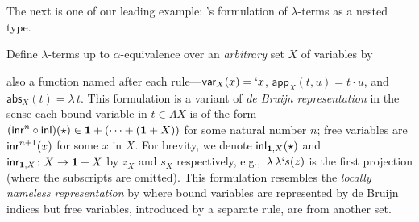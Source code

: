 \documentclass[acmsmall,review]{acmart}\settopmatter{printfolios=true,printccs=false,printacmref=false}
\theoremstyle{acmdefinition}
\begin{document}
The next is one of our leading example: \citet{Bird1999}'s formulation of $\lambda$-terms as a nested type.
\begin{example}\label{ex:untyped-lambda-calculus}
  Define $\lambda$-terms up to $\alpha$-equivalence over an \emph{arbitrary} set $X$ of variables by
\begin{figure}[H]
  \begin{minipage}[b]{.3\textwidth}
    \begin{prooftree}
    \end{prooftree}
  \end{minipage}
  \begin{minipage}[b]{.3\textwidth}
    \begin{prooftree}
    \end{prooftree}
  \end{minipage}
  \begin{minipage}[b]{.3\textwidth}
    \begin{prooftree}
    \end{prooftree}
  \end{minipage}
\end{figure}%
\noindent also a function named after each rule---$\mathsf{var}_X(x) = `x$, $\mathsf{app}_X(t, u) = t \cdot u$, and $\mathsf{abs}_{X}(t) = \lambda\,t$.
  This formulation is a variant of \emph{de Bruijn representation} in the sense each bound variable in $t \in \Lambda X$ is of the form $(\inr^n \circ \inl)(\ttt) \in \Unit + (\cdots + (\Unit + X))$ for some natural number $n$;
  free variables are $\inr^{n+1}(x)$ for some $x$ in $X$.
  For brevity, we denote $\inl_{\Unit, X}(\ttt)$ and $\inr_{\Unit, X} \colon X \to \Unit + X$ by $z_X$ and $s_X$ respectively, e.g.,\ $\lambda\,\lambda `s(z)$ is the first projection (where the subscripts are omitted).
  This formulation resembles the \emph{locally nameless representation} by \citet{Chargueraud2012} where bound variables are represented by de Bruijn indices but free variables, introduced by a separate rule, are from another set.


\end{example}
\end{document}
